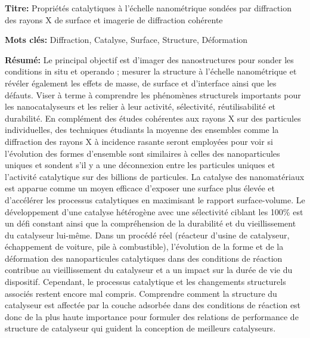 \begin{mdframed}[linecolor=Prune,linewidth=1]

\textbf{Titre:} Propriétés catalytiques à l’échelle nanométrique sondées par diffraction des rayons X de surface et imagerie de diffraction cohérente

\noindent \textbf{Mots clés:} Diffraction, Catalyse, Surface, Structure, Déformation

\vspace{-.5cm}
\begin{multicols}{2}
\noindent \textbf{Résumé:} Le principal objectif est d'imager des nanostructures pour sonder les conditions in situ et operando ; mesurer la structure à l'échelle nanométrique et révéler également les effets de masse, de surface et d'interface ainsi que les défauts. Viser à terme à comprendre les phénomènes structurels importants pour les nanocatalyseurs et les relier à leur activité, sélectivité, réutilisabilité et durabilité. En complément des études cohérentes aux rayons X sur des particules individuelles, des techniques étudiants la moyenne des ensembles comme la diffraction des rayons X à incidence rasante seront employées pour voir si l'évolution des formes d'ensemble sont similaires à celles des nanoparticules uniques et sondent s'il y a une déconnexion entre les particules uniques et l'activité catalytique sur des billions de particules. La catalyse des nanomatériaux est apparue comme un moyen efficace d'exposer une surface plus élevée et d'accélérer les processus catalytiques en maximisant le rapport surface-volume. Le développement d'une catalyse hétérogène avec une sélectivité ciblant les 100\% est un défi constant ainsi que la compréhension de la durabilité et du vieillissement du catalyseur lui-même. Dans un procédé réel (réacteur d'usine de catalyseur, échappement de voiture, pile à combustible), l'évolution de la forme et de la déformation des nanoparticules catalytiques dans des conditions de réaction contribue au vieillissement du catalyseur et a un impact sur la durée de vie du dispositif. Cependant, le processus catalytique et les changements structurels associés restent encore mal compris. Comprendre comment la structure du catalyseur est affectée par la couche adsorbée dans des conditions de réaction est donc de la plus haute importance pour formuler des relations de performance de structure de catalyseur qui guident la conception de meilleurs catalyseurs.
\end{multicols}

\end{mdframed}

